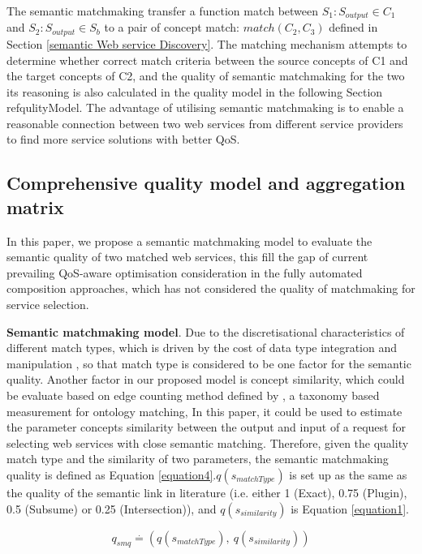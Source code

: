 \documentclass{llncs}
\begin{document}
The semantic matchmaking transfer a function match between $S_{1}: S_{output} \in C_{1}$ and $S_{2}:S_{output} \in S_{b}$ to a pair of concept match: $match(C_{2}, C_{3})$ defined in Section \ref{semantic Web service Discovery}. The matching mechanism attempts to determine whether correct match criteria between the source concepts of C1 and the target concepts of C2, and the quality of semantic matchmaking for the two its reasoning is also calculated in the quality model in the following Section ref{qulityModel}. The advantage of utilising semantic matchmaking is to enable a reasonable connection between two web services from different service providers to find more service solutions with better QoS.

\subsection{Comprehensive quality model and aggregation matrix}\label{qulityModel}
In this paper, we propose a semantic matchmaking model to evaluate the semantic quality of two matched web services, this fill the gap of current prevailing QoS-aware optimisation consideration in the fully automated composition approaches, which has not considered the quality of matchmaking for service selection.

\textbf{Semantic matchmaking model}. Due to the discretisational characteristics of different match types, which is driven by the cost of  data type integration and manipulation \cite{lecue2009optimizing}, so that match type is considered to be one factor for the semantic quality. Another factor in our proposed model is concept similarity, which could be evaluate based on edge counting method defined by \cite{shet2012new}, a taxonomy based measurement for ontology matching, In this paper, it could be used to estimate the parameter concepts similarity between the output and input of a request for selecting web services with close semantic matching. Therefore, given the quality match type and the similarity of two parameters, the semantic matchmaking quality is defined as Equation \ref{equation4}.$q(s_ {matchType})$ is set up as the same as the quality of the semantic link in literature \cite{lecue2009optimizing} (i.e. either 1 (Exact), 0.75 (Plugin), 0.5 (Subsume) or 0.25 (Intersection)), and $q(s_ {similarity})$ is Equation \ref{equation1}.

\begin{equation}
\label{equation4}
q_{smq} \stackrel{.}{=} (q(s_ {matchType}), \  q(s_ {similarity}))
\end{equation}
\end{document}
